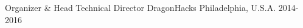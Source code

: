 \begin{cvhonors}
  \cvhonor
    {Organizer \& Head Technical Director}
    {DragonHacks}
    {Philadelphia, U.S.A.}
    {2014-2016}
\end{cvhonors}
